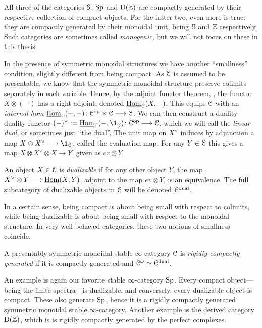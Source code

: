 All three of the categories $\Spaces$, $\Sp$ and $\Der(\Z)$ are compactly generated by their respective collection of compact objects. For the latter two, even more is true: they are compactly generated by their monoidal unit, being $\S$ and $\Z$ respectively. Such categories are sometimes called \emph{monogenic}, but we will not focus on these in this thesis. 

In the presence of symmetric monoidal structures we have another ``smallness'' condition, slightly different from being compact. As $\C$ is assumed to be presentable, we know that the symmetric monoidal structure preserve colimits separately in each variable. Hence, by the adjoint functor theorem, \cite[5.5.2.9]{lurie_09}, the functor $X\otimes (-)$ has a right adjoint, denoted $\iHom_\C(X,-)$. This equips $\C$ with an \emph{internal hom} $\iHom_\C(-,-)\: \C\op\times \C\to \C$. We can then construct a duality duality functor $(-)^\vee:=\iHom_\C(-,\1_\C)\: \C\op \to \C$, which we will call the \emph{linear dual}, or sometimes just ``the dual''. The unit map on $X^\vee$ induces by adjunction a map $X\otimes X^\vee \to \1_\C$, called the evaluation map. For any $Y\in \C$ this gives a map $X\otimes X^\vee \otimes X\to Y$, given as $ev \otimes Y$. 

\begin{definition}
    \label{ch0:def:dualizable-object}
    An object $X\in \C$ is \emph{dualizable} if for any other object $Y$, the map $X^\vee\otimes Y\to \iHom(X,Y)$, adjoint to the map $ev\otimes Y$, is an equivalence. The full subcategory of dualizable objects in $\C$ will be denoted $\C\dual$. 
\end{definition}

In a certain sense, being compact is about being small with respect to colimits, while being dualizable is about being small with respect to the monoidal structure. In very well-behaved categories, these two notions of smallness coincide. 

\begin{definition}
    \label{ch0:rigidly-generated-category}
    A presentably symmetric monoidal stable $\infty$-category $\C$ is \emph{rigidly compactly generated} if it is compactly generated and $\Co\simeq \C\dual$. 
\end{definition}

\begin{example}
    An example is again our favorite stable $\infty$-category $\Sp$. Every compact object---being the finite spectra---is dualizable, and conversely, every dualizable object is compact. These also generate $\Sp$, hence it is a rigidly compactly generated symmetric monoidal stable $\infty$-category. Another example is the derived category $\Der(\Z)$, which is is rigidly compactly generated by the perfect complexes. 
\end{example}

